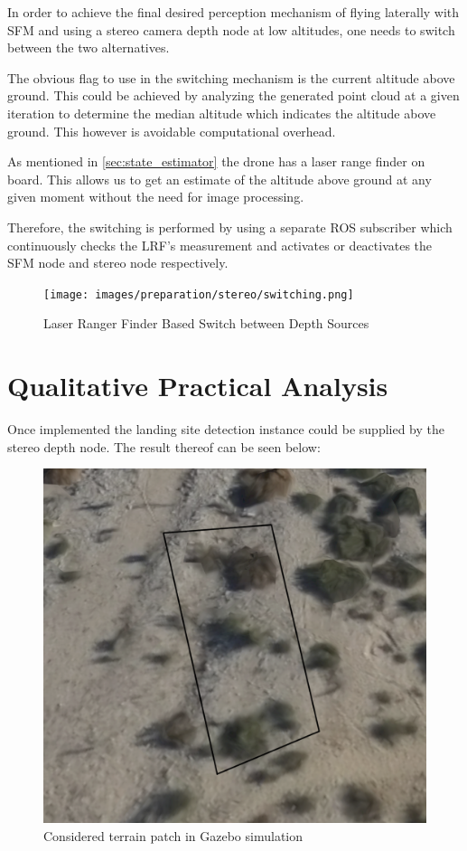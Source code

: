In order to achieve the final desired perception mechanism of flying laterally with SFM and using a stereo camera depth node at low altitudes, one needs to switch between the two alternatives.

The obvious flag to use in the switching mechanism is the current altitude above ground. This could be achieved by analyzing the generated point cloud at a given iteration to determine the median altitude which indicates the altitude above ground. This however is avoidable computational overhead.

As mentioned in \cref{sec:state_estimator} the drone has a laser range finder on board. This allows us to get an estimate of the altitude above ground at any given moment without the need for image processing.

Therefore, the switching is performed by using a separate ROS subscriber which continuously checks the LRF's measurement and activates or deactivates the SFM node and stereo node respectively.

\clearpage %
\begin{figure}
    \centering
    \texttt{[image: images/preparation/stereo/switching.png]}
    \caption{Laser Ranger Finder Based Switch between Depth Sources}
\end{figure}

\section{Qualitative Practical Analysis}

Once implemented the landing site detection instance could be supplied by the stereo depth node. The result thereof can be seen below:

\begin{figure}[ht!]
    \centering
    \includegraphics[scale=0.2, angle=-12]{images/preparation/reference_map2.5m_annotated.png}
    \caption{Considered terrain patch in Gazebo simulation}
    \label{stereo_reference}
\end{figure}


